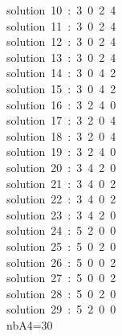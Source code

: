 \begin{tabbing}
solution\ 10\ :\ 3\ 0\ 2\ 4\ \\[0pt]
solution\ 11\ :\ 3\ 0\ 2\ 4\ \\[0pt]
solution\ 12\ :\ 3\ 0\ 2\ 4\ \\[0pt]
solution\ 13\ :\ 3\ 0\ 2\ 4\ \\[0pt]
solution\ 14\ :\ 3\ 0\ 4\ 2\ \\[0pt]
solution\ 15\ :\ 3\ 0\ 4\ 2\ \\[0pt]
solution\ 16\ :\ 3\ 2\ 4\ 0\ \\[0pt]
solution\ 17\ :\ 3\ 2\ 0\ 4\ \\[0pt]
solution\ 18\ :\ 3\ 2\ 0\ 4\ \\[0pt]
solution\ 19\ :\ 3\ 2\ 4\ 0\ \\[0pt]
solution\ 20\ :\ 3\ 4\ 2\ 0\ \\[0pt]
solution\ 21\ :\ 3\ 4\ 0\ 2\ \\[0pt]
solution\ 22\ :\ 3\ 4\ 0\ 2\ \\[0pt]
solution\ 23\ :\ 3\ 4\ 2\ 0\ \\[0pt]
solution\ 24\ :\ 5\ 2\ 0\ 0\ \\[0pt]
solution\ 25\ :\ 5\ 0\ 2\ 0\ \\[0pt]
solution\ 26\ :\ 5\ 0\ 0\ 2\ \\[0pt]
solution\ 27\ :\ 5\ 0\ 0\ 2\ \\[0pt]
solution\ 28\ :\ 5\ 0\ 2\ 0\ \\[0pt]
solution\ 29\ :\ 5\ 2\ 0\ 0\ \\[0pt]
nbA4=30\\[0pt]

\end{tabbing}
